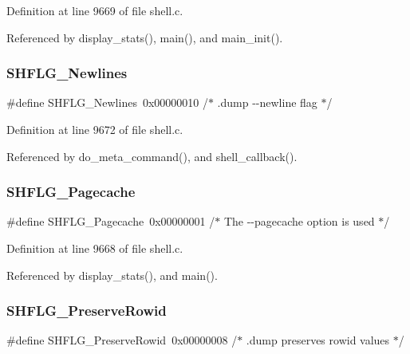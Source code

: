 Definition at line 9669 of file shell.\+c.



Referenced by display\+\_\+stats(), main(), and main\+\_\+init().

\mbox{\label{shell_8c_a8c2dd7cbc2b84a419b103d189dcc0ca5}} 
\subsubsection{S\+H\+F\+L\+G\+\_\+\+Newlines}
{\footnotesize\ttfamily \#define S\+H\+F\+L\+G\+\_\+\+Newlines~0x00000010 /$\ast$ .\+dump -\/-\/newline flag $\ast$/}



Definition at line 9672 of file shell.\+c.



Referenced by do\+\_\+meta\+\_\+command(), and shell\+\_\+callback().

\mbox{\label{shell_8c_a2c3d6c2e9c3b6c0c2bf328da372caf31}} 
\subsubsection{S\+H\+F\+L\+G\+\_\+\+Pagecache}
{\footnotesize\ttfamily \#define S\+H\+F\+L\+G\+\_\+\+Pagecache~0x00000001 /$\ast$ The -\/-\/pagecache option is used $\ast$/}



Definition at line 9668 of file shell.\+c.



Referenced by display\+\_\+stats(), and main().

\mbox{\label{shell_8c_a41837cc99ab29fb2fdf13ccd977e333a}} 
\subsubsection{S\+H\+F\+L\+G\+\_\+\+Preserve\+Rowid}
{\footnotesize\ttfamily \#define S\+H\+F\+L\+G\+\_\+\+Preserve\+Rowid~0x00000008 /$\ast$ .\+dump preserves rowid values $\ast$/}



